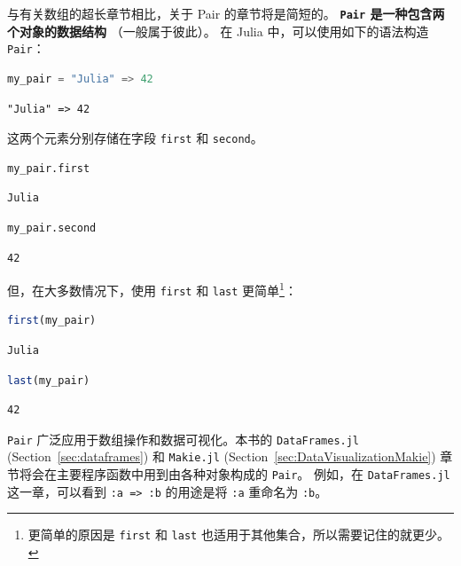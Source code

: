 \documentclass[
  notoc %
]{tufte-book}
\newcommand{\passthrough}[1]{#1}
\begin{document}
与有关数组的超长章节相比，关于 Pair 的章节将是简短的。
\textbf{\passthrough{\lstinline!Pair!} 是一种包含两个对象的数据结构}
（一般属于彼此）。 在 Julia 中，可以使用如下的语法构造
\passthrough{\lstinline!Pair!}：

\begin{lstlisting}[language=Julia]
my_pair = "Julia" => 42
\end{lstlisting}

\begin{lstlisting}[language=Output]
"Julia" => 42
\end{lstlisting}

这两个元素分别存储在字段 \passthrough{\lstinline!first!} 和
\passthrough{\lstinline!second!}。

\begin{lstlisting}[language=Julia]
my_pair.first
\end{lstlisting}

\begin{lstlisting}[language=Output]
Julia
\end{lstlisting}

\begin{lstlisting}[language=Julia]
my_pair.second
\end{lstlisting}

\begin{lstlisting}[language=Output]
42
\end{lstlisting}

但，在大多数情况下，使用 \passthrough{\lstinline!first!} 和
\passthrough{\lstinline!last!} 更简单\footnote{更简单的原因是
  \passthrough{\lstinline!first!} 和 \passthrough{\lstinline!last!}
  也适用于其他集合，所以需要记住的就更少。}：

\begin{lstlisting}[language=Julia]
first(my_pair)
\end{lstlisting}

\begin{lstlisting}[language=Output]
Julia
\end{lstlisting}

\begin{lstlisting}[language=Julia]
last(my_pair)
\end{lstlisting}

\begin{lstlisting}[language=Output]
42
\end{lstlisting}

\passthrough{\lstinline!Pair!} 广泛应用于数组操作和数据可视化。本书的
\passthrough{\lstinline!DataFrames.jl!} (Section~\ref{sec:dataframes})
和 \passthrough{\lstinline!Makie.jl!}
(Section~\ref{sec:DataVisualizationMakie})
章节将会在主要程序函数中用到由各种对象构成的
\passthrough{\lstinline!Pair!}。 例如，在
\passthrough{\lstinline!DataFrames.jl!} 这一章，可以看到
\passthrough{\lstinline!:a => :b!} 的用途是将
\passthrough{\lstinline!:a!} 重命名为 \passthrough{\lstinline!:b!}。
\end{document}
